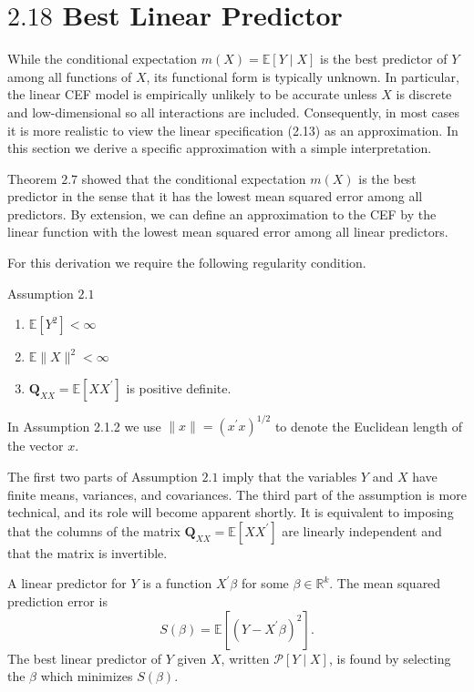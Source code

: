 \documentclass[10pt]{article}
\begin{document}
\section{$2.18$ Best Linear Predictor}
While the conditional expectation $m(X)=\mathbb{E}[Y \mid X]$ is the best predictor of $Y$ among all functions of $X$, its functional form is typically unknown. In particular, the linear CEF model is empirically unlikely to be accurate unless $X$ is discrete and low-dimensional so all interactions are included. Consequently, in most cases it is more realistic to view the linear specification (2.13) as an approximation. In this section we derive a specific approximation with a simple interpretation.

Theorem $2.7$ showed that the conditional expectation $m(X)$ is the best predictor in the sense that it has the lowest mean squared error among all predictors. By extension, we can define an approximation to the CEF by the linear function with the lowest mean squared error among all linear predictors.

For this derivation we require the following regularity condition.

Assumption $2.1$

\begin{enumerate}
  \item $\mathbb{E}\left[Y^{2}\right]<\infty$
  \item $\mathbb{E}\|X\|^{2}<\infty$
  \item $\boldsymbol{Q}_{X X}=\mathbb{E}\left[X X^{\prime}\right]$ is positive definite.
\end{enumerate}
In Assumption 2.1.2 we use $\|x\|=\left(x^{\prime} x\right)^{1 / 2}$ to denote the Euclidean length of the vector $x$.

The first two parts of Assumption $2.1$ imply that the variables $Y$ and $X$ have finite means, variances, and covariances. The third part of the assumption is more technical, and its role will become apparent shortly. It is equivalent to imposing that the columns of the matrix $\boldsymbol{Q}_{X X}=\mathbb{E}\left[X X^{\prime}\right]$ are linearly independent and that the matrix is invertible.

A linear predictor for $Y$ is a function $X^{\prime} \beta$ for some $\beta \in \mathbb{R}^{k}$. The mean squared prediction error is
$$
S(\beta)=\mathbb{E}\left[\left(Y-X^{\prime} \beta\right)^{2}\right] .
$$
The best linear predictor of $Y$ given $X$, written $\mathscr{P}[Y \mid X]$, is found by selecting the $\beta$ which minimizes $S(\beta)$.
\end{document}

